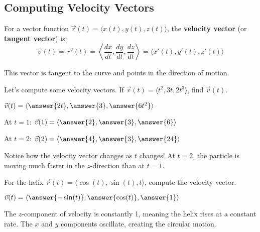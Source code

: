 \documentclass{ximera}
\begin{document}
\subsection*{Computing Velocity Vectors}

\begin{definition}
For a vector function $\vec{r}(t) = \langle x(t), y(t), z(t) \rangle$, the \textbf{velocity vector} (or \textbf{tangent vector}) is:
$$\vec{v}(t) = \vec{r}'(t) = \left\langle \frac{dx}{dt}, \frac{dy}{dt}, \frac{dz}{dt} \right\rangle = \langle x'(t), y'(t), z'(t) \rangle$$

This vector is tangent to the curve and points in the direction of motion.
\end{definition}

\begin{problem}
Let's compute some velocity vectors. If $\vec{r}(t) = \langle t^2, 3t, 2t^3 \rangle$, find $\vec{v}(t)$.

$\vec{v}(t) = \langle \answer{2t}, \answer{3}, \answer{6t^2} \rangle$

At $t=1$: $\vec{v}(1) = \langle \answer{2}, \answer{3}, \answer{6} \rangle$

At $t=2$: $\vec{v}(2) = \langle \answer{4}, \answer{3}, \answer{24} \rangle$

\begin{feedback}
Notice how the velocity vector changes as $t$ changes! At $t=2$, the particle is moving much faster in the $z$-direction than at $t=1$.
\end{feedback}
\end{problem}

\begin{problem}
For the helix $\vec{r}(t) = \langle \cos(t), \sin(t), t \rangle$, compute the velocity vector.

$\vec{v}(t) = \langle \answer{-\sin(t)}, \answer{\cos(t)}, \answer{1} \rangle$

\begin{feedback}
The $z$-component of velocity is constantly 1, meaning the helix rises at a constant rate. The $x$ and $y$ components oscillate, creating the circular motion.
\end{feedback}
\end{problem}
\end{document}
